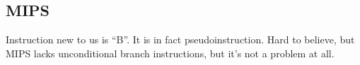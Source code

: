 ﻿\ifx\RUSSIAN\undefined
\subsection{MIPS}



Instruction new to us is ``B''. 
It is in fact pseudoinstruction. 
Hard to believe, but MIPS lacks unconditional branch instructions, but it's not a problem at all.

\fi
